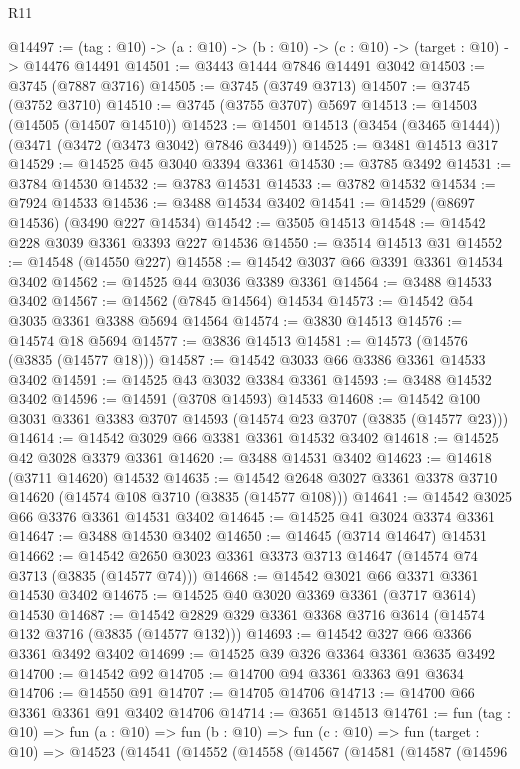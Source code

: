 \begin{lexlean}{R11}
\begin{coremodule}
@14497 := (tag : @10) -> (a : @10) -> (b : @10) -> (c : @10) -> (target : @10) -> @14476 @14491
@14501 := @3443 @1444 @7846 @14491 @3042
@14503 := @3745 (@7887 @3716)
@14505 := @3745 (@3749 @3713)
@14507 := @3745 (@3752 @3710)
@14510 := @3745 (@3755 @3707) @5697
@14513 := @14503 (@14505 (@14507 @14510))
@14523 := @14501 @14513 (@3454 (@3465 @1444)) (@3471 (@3472 (@3473 @3042) @7846 @3449))
@14525 := @3481 @14513 @317
@14529 := @14525 @45 @3040 @3394 @3361
@14530 := @3785 @3492
@14531 := @3784 @14530
@14532 := @3783 @14531
@14533 := @3782 @14532
@14534 := @7924 @14533
@14536 := @3488 @14534 @3402
@14541 := @14529 (@8697 @14536) (@3490 @227 @14534)
@14542 := @3505 @14513
@14548 := @14542 @228 @3039 @3361 @3393 @227 @14536
@14550 := @3514 @14513 @31
@14552 := @14548 (@14550 @227)
@14558 := @14542 @3037 @66 @3391 @3361 @14534 @3402
@14562 := @14525 @44 @3036 @3389 @3361
@14564 := @3488 @14533 @3402
@14567 := @14562 (@7845 @14564) @14534
@14573 := @14542 @54 @3035 @3361 @3388 @5694 @14564
@14574 := @3830 @14513
@14576 := @14574 @18 @5694
@14577 := @3836 @14513
@14581 := @14573 (@14576 (@3835 (@14577 @18)))
@14587 := @14542 @3033 @66 @3386 @3361 @14533 @3402
@14591 := @14525 @43 @3032 @3384 @3361
@14593 := @3488 @14532 @3402
@14596 := @14591 (@3708 @14593) @14533
@14608 := @14542 @100 @3031 @3361 @3383 @3707 @14593 (@14574 @23 @3707 (@3835 (@14577 @23)))
@14614 := @14542 @3029 @66 @3381 @3361 @14532 @3402
@14618 := @14525 @42 @3028 @3379 @3361
@14620 := @3488 @14531 @3402
@14623 := @14618 (@3711 @14620) @14532
@14635 := @14542 @2648 @3027 @3361 @3378 @3710 @14620 (@14574 @108 @3710 (@3835 (@14577 @108)))
@14641 := @14542 @3025 @66 @3376 @3361 @14531 @3402
@14645 := @14525 @41 @3024 @3374 @3361
@14647 := @3488 @14530 @3402
@14650 := @14645 (@3714 @14647) @14531
@14662 := @14542 @2650 @3023 @3361 @3373 @3713 @14647 (@14574 @74 @3713 (@3835 (@14577 @74)))
@14668 := @14542 @3021 @66 @3371 @3361 @14530 @3402
@14675 := @14525 @40 @3020 @3369 @3361 (@3717 @3614) @14530
@14687 := @14542 @2829 @329 @3361 @3368 @3716 @3614 (@14574 @132 @3716 (@3835 (@14577 @132)))
@14693 := @14542 @327 @66 @3366 @3361 @3492 @3402
@14699 := @14525 @39 @326 @3364 @3361 @3635 @3492
@14700 := @14542 @92
@14705 := @14700 @94 @3361 @3363 @91 @3634
@14706 := @14550 @91
@14707 := @14705 @14706
@14713 := @14700 @66 @3361 @3361 @91 @3402 @14706
@14714 := @3651 @14513
@14761 := fun (tag : @10) =>
  fun (a : @10) =>
  fun (b : @10) =>
  fun (c : @10) =>
  fun (target : @10) =>
  @14523
    (@14541
      (@14552
        (@14558
          (@14567
            (@14581
              (@14587
                (@14596

\end{coremodule}
\end{lexlean}
